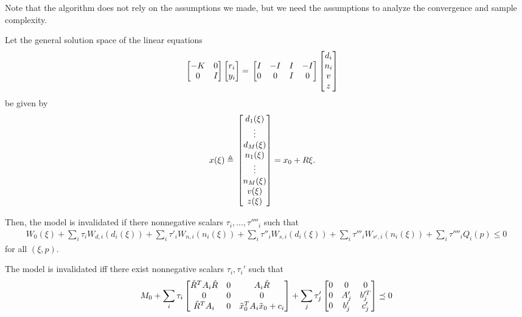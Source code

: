\documentclass[11pt, onecolumn]{article}
\theoremstyle{plain}
\theoremstyle{plain}
\theoremstyle{definition}
\begin{document}
\begin{remark}
  Note that the algorithm does not rely on the assumptions we made, but we need the assumptions to
  analyze the convergence and sample complexity.
\end{remark}

\begin{theorem}
  Let the general solution space of the linear equations
    \begin{align*}
      \begin{bmatrix}-K & 0\\0&I\end{bmatrix}\begin{bmatrix}r_i\\y_i\end{bmatrix} = &\; \begin{bmatrix}I&-I&I&-I\\0&0&I&0\end{bmatrix}\begin{bmatrix}d_i\\n_i\\v\\z\end{bmatrix}
    \end{align*}
  be given by \\
  \begin{align*}
    x(\xi) \triangleq&\; \begin{bmatrix}d_1(\xi)\\\vdots\\d_M(\xi)\\n_1(\xi)\\\vdots\\n_M(\xi)\\v(\xi)\\z(\xi)\end{bmatrix}= x_0 + R\xi.
  \end{align*}

  Then, the model is invalidated if there nonnegative scalars $\tau_i,\ldots,\tau''''_i$ such that
  \begin{align*}
   W_0(\xi) + \sum_i \tau_i W_{d,i}(d_i(\xi)) + \sum_i \tau'_i W_{n,i}(n_i(\xi)) + \sum_i \tau''_i W_{s,i}(d_i(\xi)) + \sum_i \tau'''_i W_{s^c,i}(n_i(\xi)) + \sum_i \tau''''_i Q_i(p) \leq 0
  \end{align*}
  for all $(\xi,p)$.
\end{theorem}

\begin{corollary}
The model is invalidated iff there exist nonnegative scalars $\tau_i, \tau_i'$ such that
  \begin{align*}
  M_0 + \sum_i \tau_i\begin{bmatrix}\tilde R^T A_i \tilde R &0 & A_i \tilde R\\0 & 0 & 0\\\tilde R^T A_i &0& \tilde x_0^TA_i\tilde x_0 + c_i\end{bmatrix} + \sum_j \tau_j'\begin{bmatrix}0 & 0 & 0 \\ 0 & A_j' & b_j'^T\\0 & b_j' & c_j'\end{bmatrix} \preceq 0
  \end{align*}
\end{corollary}
\end{document}
